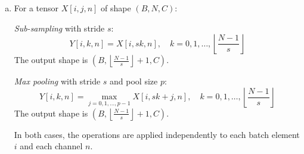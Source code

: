 \documentclass[11pt]{article}
\begin{document}
\begin{enumerate}
\begin{solution}
\begin{enumerate}[(a)]
\item For a tensor $X[i,j,n]$ of shape $(B,N,C)$:

\emph{Sub-sampling} with stride $s$:
\[
Y[i,k,n] = X[i,sk,n], \quad k = 0, 1, \ldots, \left\lfloor \frac{N-1}{s} \right\rfloor
\]
The output shape is $\left(B, \left\lfloor \frac{N-1}{s} \right\rfloor + 1, C\right)$.

\emph{Max pooling} with stride $s$ and pool size $p$:
\[
Y[i,k,n] = \max_{j=0,1,\ldots,p-1} X[i,sk+j,n], \quad k = 0, 1, \ldots, \left\lfloor \frac{N-1}{s} \right\rfloor
\]
The output shape is $\left(B, \left\lfloor \frac{N-1}{s} \right\rfloor + 1, C\right)$.

In both cases, the operations are applied independently to each batch element $i$ and each channel $n$.
\end{enumerate}
\end{solution}

\end{enumerate}
\end{document}
